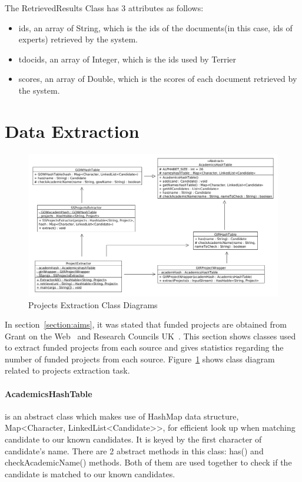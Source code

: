 The RetrievedResults Class has 3 attributes as follows:
\begin{itemize}
 \item ids, an array of String, which is the ids of the documents(in this case, ids of experts) retrieved by the system.
 \item tdocids, an array of Integer, which is the ids used by Terrier
 \item scores, an array of Double, which is the scores of each document retrieved by the system.
\end{itemize}

\section{Data Extraction}
\begin{figure}
\centering
\includegraphics[scale=0.35]{./figures/projectsExtraction.png}
\caption{Projects Extraction Class Diagrams} \label{fig:projectsExtraction} 
\end{figure}
In section~\ref{section:aims}, it was stated that funded projects are obtained from Grant on the Web~\cite{gow} and Research Councils UK~\cite{gtr}.
This section shows classes used to extract funded projects from each source and gives statistics regarding the number of funded projects from each source.
Figure~\ref{fig:projectsExtraction} shows class diagram related to projects extraction task.
\paragraph{AcademicsHashTable} is an abstract class which makes use of HashMap data structure, Map<Character, LinkedList<Candidate>>, for efficient look up when matching candidate to our
known candidates. It is keyed by the first character of candidate's name. There are 2 abstract methods in this class: has() and checkAcademicName() methods.
Both of them are used together to check if the candidate is matched to our known candidates.
